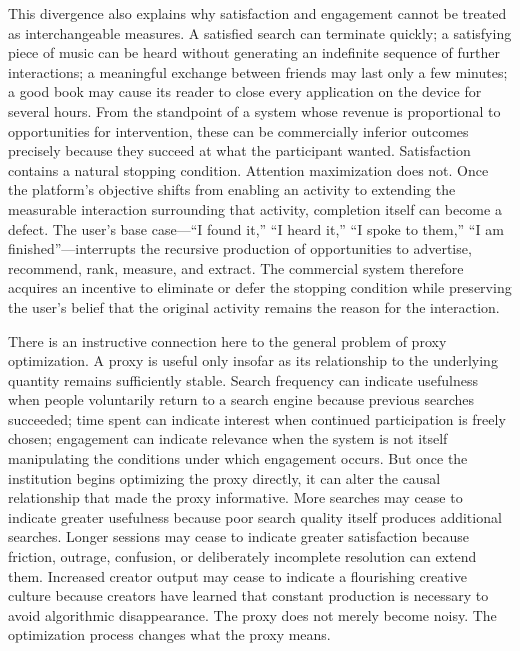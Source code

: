 \documentclass[11pt]{article}
\begin{document}
This divergence also explains why satisfaction and engagement cannot be treated as interchangeable measures. A satisfied search can terminate quickly; a satisfying piece of music can be heard without generating an indefinite sequence of further interactions; a meaningful exchange between friends may last only a few minutes; a good book may cause its reader to close every application on the device for several hours. From the standpoint of a system whose revenue is proportional to opportunities for intervention, these can be commercially inferior outcomes precisely because they succeed at what the participant wanted. Satisfaction contains a natural stopping condition. Attention maximization does not. Once the platform's objective shifts from enabling an activity to extending the measurable interaction surrounding that activity, completion itself can become a defect. The user's base case---``I found it,'' ``I heard it,'' ``I spoke to them,'' ``I am finished''---interrupts the recursive production of opportunities to advertise, recommend, rank, measure, and extract. The commercial system therefore acquires an incentive to eliminate or defer the stopping condition while preserving the user's belief that the original activity remains the reason for the interaction.

There is an instructive connection here to the general problem of proxy optimization. A proxy is useful only insofar as its relationship to the underlying quantity remains sufficiently stable. Search frequency can indicate usefulness when people voluntarily return to a search engine because previous searches succeeded; time spent can indicate interest when continued participation is freely chosen; engagement can indicate relevance when the system is not itself manipulating the conditions under which engagement occurs. But once the institution begins optimizing the proxy directly, it can alter the causal relationship that made the proxy informative. More searches may cease to indicate greater usefulness because poor search quality itself produces additional searches. Longer sessions may cease to indicate greater satisfaction because friction, outrage, confusion, or deliberately incomplete resolution can extend them. Increased creator output may cease to indicate a flourishing creative culture because creators have learned that constant production is necessary to avoid algorithmic disappearance. The proxy does not merely become noisy. The optimization process changes what the proxy means.
\end{document}
